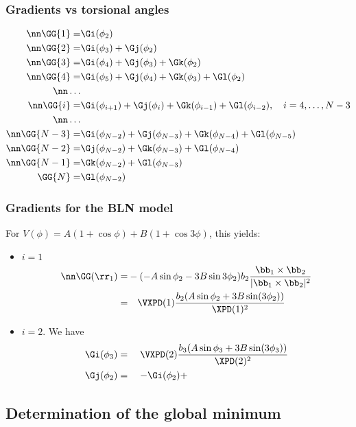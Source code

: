 \subsubsection{Gradients vs torsional angles}

\begin{align}
  \nn\GG{1}=&\Gi(\phi_2)\\
  \nn\GG{2}=&\Gi(\phi_3)+\Gj(\phi_2)\\
  \nn\GG{3}=&\Gi(\phi_4)+\Gj(\phi_3)+\Gk(\phi_2)\\
  \nn\GG{4}=&\Gi(\phi_5)+\Gj(\phi_4)+\Gk(\phi_3)+\Gl(\phi_2)\\
  \nn\ldots\\
  \nn\GG{i}=&\Gi(\phi_{i+1})+\Gj(\phi_i)+\Gk(\phi_{i-1})+\Gl(\phi_{i-2}),\quad i=4,\ldots,N-3\\
  \nn\ldots\\
  \nn\GG{N-3}=&\Gi(\phi_{N-2})+\Gj(\phi_{N-3})+\Gk(\phi_{N-4})+\Gl(\phi_{N-5})\\
  \nn\GG{N-2}=&\Gj(\phi_{N-2})+\Gk(\phi_{N-3})+\Gl(\phi_{N-4})\\
  \nn\GG{N-1}=&\Gk(\phi_{N-2})+\Gl(\phi_{N-3})\\
  \GG{N}=&\Gl(\phi_{N-2})
\end{align}

\subsubsection{Gradients for the BLN model}

For $V(\phi)=A(1+\cos\phi)+B(1+\cos{3\phi})$, this yields:
\begin{itemize}
\item $i=1$ 
\begin{align}
  \nn\GG(\rr_1)=& -(-A\sin\phi_2-3B\sin{3\phi_2})
  b_2\frac{\bb_1\times\bb_2}{|\bb_1\times\bb_2|^2}\\
  =&\quad\VXPD(1)\frac{b_2(A\sin\phi_2+3B\sin(3\phi_2))}{\XPD(1)^2}
\end{align}
\item $i=2$. We have
  \begin{align}
    \Gi(\phi_3)&=\quad\VXPD(2)\frac{b_3(A\sin\phi_3+3B\sin(3\phi_3))}{\XPD(2)^2}\\
    \Gj(\phi_2)&=\quad -\Gi(\phi_2)+
  \end{align}
\end{itemize}

\subsection{Determination of the global minimum}


